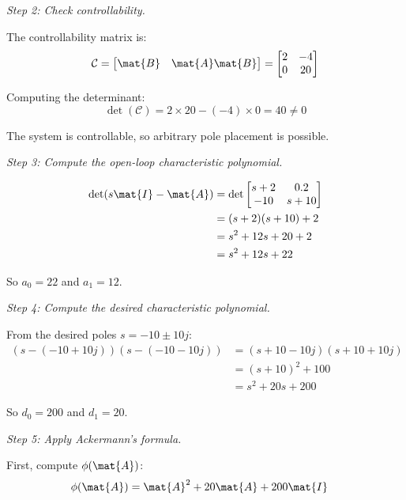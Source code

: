 \textit{Step 2: Check controllability.}

The controllability matrix is:
\begin{equation}
\mathcal{C} = \begin{bmatrix} \mat{B} & \mat{A}\mat{B} \end{bmatrix}
= \begin{bmatrix} 2 & -4 \\ 0 & 20 \end{bmatrix}
\end{equation}

Computing the determinant:
\begin{equation}
\det(\mathcal{C}) = 2 \times 20 - (-4) \times 0 = 40 \neq 0
\end{equation}

The system is controllable, so arbitrary pole placement is possible.

\textit{Step 3: Compute the open-loop characteristic polynomial.}

\begin{align}
\det(s\mat{I} - \mat{A}) &= \det\begin{bmatrix} s+2 & 0.2 \\ -10 & s+10 \end{bmatrix} \nonumber \\
&= (s+2)(s+10) + 2 \nonumber \\
&= s^2 + 12s + 20 + 2 \nonumber \\
&= s^2 + 12s + 22
\end{align}

So $a_0 = 22$ and $a_1 = 12$.

\textit{Step 4: Compute the desired characteristic polynomial.}

From the desired poles $s = -10 \pm 10j$:
\begin{align}
(s - (-10+10j))(s - (-10-10j)) &= (s+10-10j)(s+10+10j) \nonumber \\
&= (s+10)^2 + 100 \nonumber \\
&= s^2 + 20s + 200
\end{align}

So $d_0 = 200$ and $d_1 = 20$.

\textit{Step 5: Apply Ackermann's formula.}

First, compute $\phi(\mat{A})$:
\begin{align}
\phi(\mat{A}) &= \mat{A}^2 + 20\mat{A} + 200\mat{I}
\end{align}

